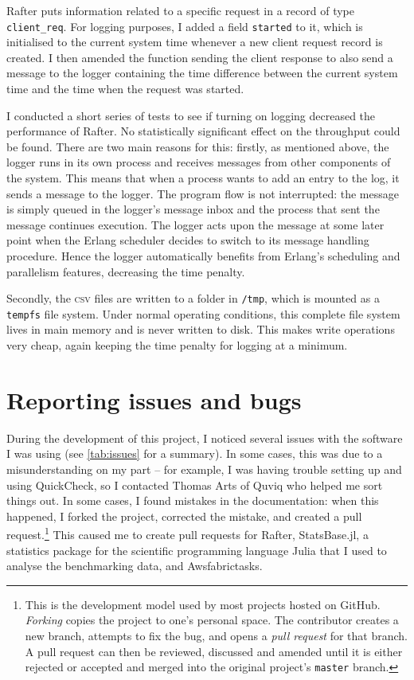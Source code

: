 \documentclass[12pt,chapterprefix=true,toc=bibliography,numbers=noendperiod,
               footnotes=multiple,twoside]{scrreprt}
\begin{document}
Rafter puts information related to a specific request in a record of type \texttt{client\_req}. For logging purposes, I added a field \texttt{started} to it, which is initialised to the current system time whenever a new client request record is created. I then amended the function sending the client response to also send a message to the logger containing the time difference between the current system time and the time when the request was started.

I conducted a short series of tests to see if turning on logging decreased the performance of Rafter. No statistically significant effect on the throughput could be found. There are two main reasons for this: firstly, as mentioned above, the logger runs in its own process and receives messages from other components of the system. This means that when a process wants to add an entry to the log, it sends a message to the logger. The program flow is not interrupted: the message is simply queued in the logger's message inbox and the process that sent the message continues execution. The logger acts upon the message at some later point when the Erlang scheduler decides to switch to its message handling procedure. Hence the logger automatically benefits from Erlang's scheduling and parallelism features, decreasing the time penalty.

Secondly, the \textsc{csv} files are written to a folder in \texttt{/tmp}, which is mounted as a \texttt{tempfs} file system. Under normal operating conditions, this complete file system lives in main memory and is never written to disk. This makes write operations very cheap, again keeping the time penalty for logging at a minimum.

\section{Reporting issues and bugs}

During the development of this project, I noticed several issues with the software I was using (see \cref{tab:issues} for a summary). In some cases, this was due to a misunderstanding on my part -- for example, I was having trouble setting up and using QuickCheck, so I contacted Thomas Arts of Quviq who helped me sort things out. In some cases, I found mistakes in the documentation: when this happened, I forked the project, corrected the mistake, and created a pull request.\footnote{This is the development model used by most projects hosted on GitHub. \emph{Forking} copies the project to one's personal space. The contributor creates a new branch, attempts to fix the bug, and opens a \emph{pull request} for that branch. A pull request can then be reviewed, discussed and amended until it is either rejected or accepted and merged into the original project's \texttt{master} branch.} This caused me to create pull requests for Rafter, StatsBase.jl, a statistics package for the scientific programming language Julia that I used to analyse the benchmarking data, and Awsfabrictasks.
\end{document}
